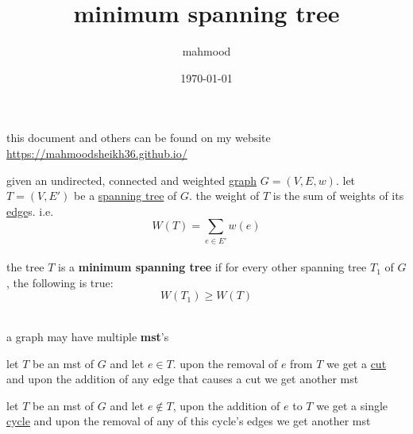 \documentclass[a4paper,12pt]{article}
\author{mahmood}
\date{\today}
\title{minimum spanning tree}
\begin{document}
\maketitle
\begin{note}
this document and others can be found on my website\\
\url{https://mahmoodsheikh36.github.io/}
\end{note}
\begin{definition}
given an undirected, connected and weighted \href{20230314001051-graph.org}{graph} \(G=(V,E,w)\). let \(T=(V,E')\) be a \href{20230415231645-spanning_tree.org}{spanning tree} of \(G\). the weight of \(T\) is the sum of weights of its \href{20230314001632-edge.org}{edge}s. i.e.\\
\[
W(T) = \sum_{e \in E'} w(e)
\]\\
the tree \(T\) is a \textbf{minimum spanning tree} if for every other spanning tree \(T_1\) of \(G\), the following is true:\\
\[
W(T_1) \geq W(T)
\]\\
\end{definition}
\begin{note}
a graph may have multiple \textbf{mst}'s\\
\end{note}
\begin{lemma}
let \(T\) be an mst of \(G\) and let \(e \in T\). upon the removal of \(e\) from \(T\) we get a \href{20230508181651-cut.org}{cut} and upon the addition of any edge that causes a cut we get another mst\\
\label{orgdb4b51f}
\end{lemma}
\begin{lemma}
let \(T\) be an mst of \(G\) and let \(e \notin T\), upon the addition of \(e\) to \(T\) we get a single \href{20230418001405-cycle.org}{cycle} and upon the removal of any of this cycle's edges we get another mst\\
\label{orge6bc84e}
\end{lemma}
\end{document}
